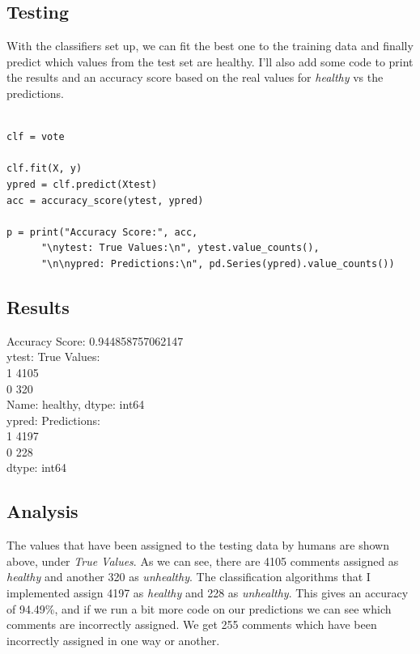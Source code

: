 \documentclass[11pt]{article}
\begin{document}
\subsection{Testing}
\label{sec:org2bf4512}
With the classifiers set up, we can fit the best one to the training data and finally predict which values from the test set are healthy.
I'll also add some code to print the results and an accuracy score based on the real values for \emph{healthy} vs the predictions.

\begin{verbatim}

clf = vote

clf.fit(X, y)
ypred = clf.predict(Xtest)
acc = accuracy_score(ytest, ypred)

p = print("Accuracy Score:", acc,
	  "\nytest: True Values:\n", ytest.value_counts(), 
	  "\n\nypred: Predictions:\n", pd.Series(ypred).value_counts())

\end{verbatim}


\subsection{Results}
\label{sec:orge9ac80f}

\noindent 
Accuracy Score: 0.944858757062147\\

\noindent 
ytest: True Values:\\
1    4105\\
0     320\\
Name: healthy, dtype: int64\\

\noindent 
ypred: Predictions:\\
1    4197\\
0     228\\
dtype: int64\\


\subsection{Analysis}
\label{sec:orgcb349a2}

The values that have been assigned to the testing data by humans are shown above, under \emph{True Values}. 
As we can see, there are 4105 comments assigned as \emph{healthy} and another 320 as \emph{unhealthy}.
The classification algorithms that I implemented assign 4197 as \emph{healthy} and 228 as \emph{unhealthy}.
This gives an accuracy of 94.49\%, and if we run a bit more code on our predictions we can see which comments are incorrectly assigned.
We get 255 comments which have been incorrectly assigned in one way or another.
\end{document}
